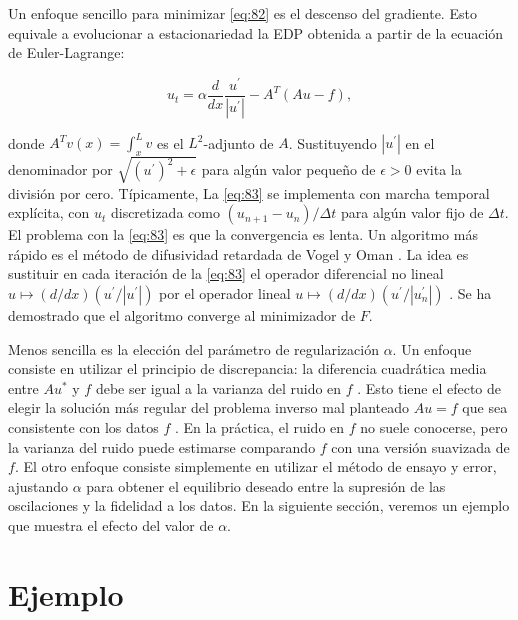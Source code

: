 Un enfoque sencillo para minimizar \cref{eq:82} es el descenso del gradiente. Esto equivale a evolucionar a estacionariedad la EDP obtenida a partir de la ecuación de Euler-Lagrange:

\begin{equation}\label{eq:83}
u_t=\alpha\frac{d}{dx}\frac{u^\prime}{\left| u^\prime\right| }-A^T\left(Au-f\right),
\end{equation}

donde $A^Tv(x)=\int_{x}^{L}v$ es el $L^2$-adjunto de $A$. Sustituyendo $\left|u^\prime \right|$  en el denominador por $\sqrt{\left(u^\prime\right)^2+\epsilon}$ para algún valor pequeño de $\epsilon>0$  evita la división por cero. Típicamente, La \cref{eq:83} se implementa con marcha temporal explícita, con $u_t$  discretizada como $\left(u_{n+1}-u_n\right)/\Delta t$ para algún valor fijo de $\Delta t$. El problema con la \cref{eq:83}  es que la convergencia es lenta. Un algoritmo más rápido es el método de difusividad retardada de Vogel y Oman \cite{vogel_iterative_1996}. La idea es sustituir en cada iteración de  la \cref{eq:83}  el operador diferencial no lineal $u\mapsto(d/dx)\left(u^\prime/ \left|u^\prime \right|\right)$ por el operador lineal $u\mapsto(d/dx)\left(u^\prime/\left|u^\prime_n \right| \right)$ . Se ha demostrado que el algoritmo converge al minimizador de $F$.


Menos sencilla es la elección del parámetro de regularización $\alpha$. Un enfoque consiste en utilizar el principio de discrepancia: la diferencia cuadrática media entre $Au^*$ y $f$  debe ser igual a la varianza del ruido en  $f$ . Esto tiene el efecto de elegir la solución más regular del problema inverso mal planteado $Au=f$  que sea consistente con los datos  $f$ . En la práctica, el ruido en $f$  no suele conocerse, pero la varianza del ruido puede estimarse comparando $f$ con una versión suavizada de  $f$. El otro enfoque consiste simplemente en utilizar el método de ensayo y error, ajustando  $\alpha$  para obtener el equilibrio deseado entre la supresión de las oscilaciones y la fidelidad a los datos. En la siguiente sección, veremos un ejemplo que muestra el efecto del valor de $\alpha$.


\section{Ejemplo}

